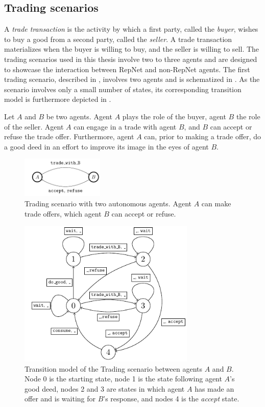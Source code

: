 \subsection{Trading scenarios}
A \textit{trade transaction} is the activity by which a first party, called the \textit{buyer}, wishes to buy a good from a second party, called the \textit{seller}. A trade transaction materializes when the buyer is willing to buy, and the seller is willing to sell. The trading scenarios used in this thesis involve two to three agents and are designed to showcase the interaction between RepNet and non-RepNet agents.
The first trading scenario, described in , involves two agents and is schematized in . As the scenario involves only a small number of states, its corresponding transition model is furthermore depicted in .
\begin{example}
\label{ex:trade2ag}
Let $A$ and $B$ be two agents. Agent $A$ plays the role of the buyer, agent $B$ the role of the seller. Agent $A$ can engage in a trade with agent $B$, and $B$ can accept or refuse the trade offer. Furthermore, agent $A$ can, prior to making a trade offer, do a good deed in an effort to improve its image in the eyes of agent $B$. 
\end{example}
\begin{figure}[h]
    \centering
    \includegraphics[width=0.35\textwidth]{images/MasterThesisVTOL2agDrawOther.pdf}
    \caption{Trading scenario with two autonomous agents. Agent $A$ can make trade offers, which agent $B$ can accept or refuse.}
    \label{fig:ex111}
\end{figure}
\begin{figure}[h]
    \centering
    \includegraphics[width=0.75\textwidth]{images/MasterThesisTrade2AgDraw (1).pdf}
    \caption{Transition model of the Trading scenario between agents $A$ and $B$. Node 0 is the starting state, node 1 is the state following agent $A$'s good deed, nodes 2 and 3 are states in which agent $A$ has made an offer and is waiting for $B$'s response, and nodes 4 is the \textit{accept} state.}
    \label{fig:ex1}
\end{figure}

